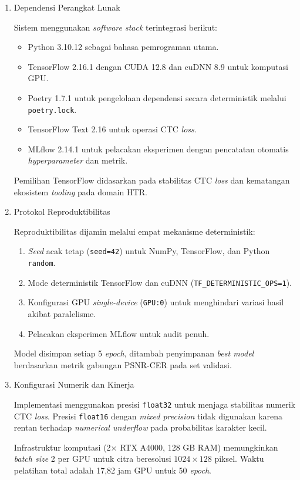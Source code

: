 \documentclass[12pt,a4paper]{article}
\begin{document}
\begin{enumerate}[label=\arabic*., leftmargin=*, wide=0pt, itemsep=1em]
    \item Dependensi Perangkat Lunak
    
    Sistem menggunakan \textit{software stack} terintegrasi berikut:
    \begin{itemize}[leftmargin=1.5em, labelsep=0.5em, noitemsep, topsep=0pt]
      \item Python 3.10.12 sebagai bahasa pemrograman utama.
      \item TensorFlow 2.16.1 dengan CUDA 12.8 dan cuDNN 8.9 untuk komputasi GPU.
      \item Poetry 1.7.1 untuk pengelolaan dependensi secara deterministik melalui \texttt{poetry.lock}.
      \item TensorFlow Text 2.16 untuk operasi CTC \textit{loss}.
      \item MLflow 2.14.1 untuk pelacakan eksperimen dengan pencatatan otomatis \textit{hyperparameter} dan metrik.
    \end{itemize}
    
    Pemilihan TensorFlow didasarkan pada stabilitas CTC \textit{loss} dan kematangan ekosistem \textit{tooling} pada domain HTR.
    
    \item Protokol Reproduktibilitas
    
    Reproduktibilitas dijamin melalui empat mekanisme deterministik:
    \begin{enumerate}[label=\alph*., leftmargin=1.5em, labelsep=0.5em, noitemsep, topsep=0pt]
      \item \textit{Seed} acak tetap (\texttt{seed=42}) untuk NumPy, TensorFlow, dan Python \texttt{random}.
      \item Mode deterministik TensorFlow dan cuDNN (\texttt{TF\_DETERMINISTIC\_OPS=1}).
      \item Konfigurasi GPU \textit{single-device} (\texttt{GPU:0}) untuk menghindari variasi hasil akibat paralelisme.
      \item Pelacakan eksperimen MLflow untuk audit penuh.
    \end{enumerate}
    
    Model disimpan setiap 5 \textit{epoch}, ditambah penyimpanan \textit{best model} berdasarkan metrik gabungan PSNR-CER pada set validasi.
    
    \item Konfigurasi Numerik dan Kinerja
    
    Implementasi menggunakan presisi \texttt{float32} untuk menjaga stabilitas numerik CTC \textit{loss}. Presisi \texttt{float16} dengan \textit{mixed precision} tidak digunakan karena rentan terhadap \textit{numerical underflow} pada probabilitas karakter kecil.
    
    Infrastruktur komputasi (2$\times$ RTX A4000, 128 GB RAM) memungkinkan \textit{batch size} 2 per GPU untuk citra beresolusi $1024 \times 128$ piksel. Waktu pelatihan total adalah 17,82 jam GPU untuk 50 \textit{epoch}.
\end{enumerate}
\end{document}
